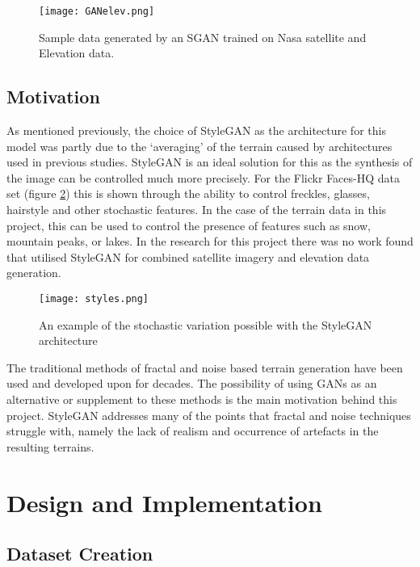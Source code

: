 \documentclass[a4paper]{report}
\begin{document}
\begin{figure}[H]
    \centering
        \texttt{[image: GANelev.png]}
        \caption{Sample data generated by an SGAN trained on Nasa satellite and Elevation data. \cite{sgan}}
        \label{fig:elevGAN}
\end{figure}

\subsection{Motivation}
As mentioned previously, the choice of StyleGAN as the architecture for this model was partly due to the `averaging' of the terrain caused by architectures used in previous studies. StyleGAN is an ideal solution for this as the synthesis of the image can be controlled much more precisely. For the Flickr Faces-HQ data set (figure \ref{fig:styles}) this is shown through the ability to control freckles, glasses, hairstyle and other stochastic features. In the case of the terrain data in this project, this can be used to control the presence of features such as snow, mountain peaks, or lakes. In the research for this project there was no work found that utilised StyleGAN for combined satellite imagery and elevation data generation.

\begin{figure}[H]
    \centering
        \texttt{[image: styles.png]}
        \caption{An example of the stochastic variation possible with the StyleGAN architecture \cite{stylegan}}
        \label{fig:styles}
\end{figure}

The traditional methods of fractal and noise based terrain generation have been used and developed upon for decades. The possibility of using GANs as an alternative or supplement to these methods is the main motivation behind this project. StyleGAN addresses many of the points that fractal and noise techniques struggle with, namely the lack of realism and occurrence of artefacts in the resulting terrains.
\section{Design and Implementation}
\subsection{Dataset Creation}
\end{document}
